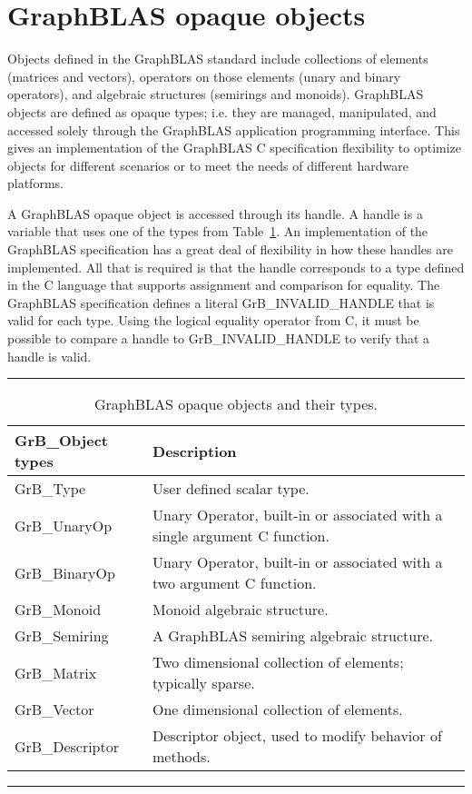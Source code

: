 \section{GraphBLAS opaque objects}

Objects defined in the GraphBLAS standard include collections of elements
(matrices and vectors), operators on those elements (unary and binary operators), and 
algebraic structures (semirings and monoids).   GraphBLAS objects are defined
as opaque types; i.e. they are managed, manipulated, and accessed solely through the
GraphBLAS application programming interface. This gives an implementation of the
GraphBLAS C specification flexibility to optimize objects for different scenarios or to meet
the needs of different hardware platforms.

A GraphBLAS opaque object is accessed through its handle.  A handle
is a variable that uses one of the types from Table~\ref{Tab:ObjTypes}.  An implementation 
of the GraphBLAS specification has a great deal of flexibility in how these
handles are implemented.  All that is required is that the handle corresponds to a type defined in the 
C language that supports assignment and comparison for equality.  The
GraphBLAS specification defines a 
literal {\sf GrB\_INVALID\_HANDLE} that is valid for each type.  Using the logical equality 
operator from C, it must be possible to compare a handle to {\sf GrB\_INVALID\_HANDLE}
to verify that a handle is valid.


\begin{table}
\hrule
\begin{center}
\caption{GraphBLAS opaque objects and their types.}
\label{Tab:ObjTypes}
\begin{tabular}{l|l}
{\sf GrB\_Object types} & Description \\
\hline
{\sf GrB\_Type}           & User defined scalar type.     \\
{\sf GrB\_UnaryOp}    & Unary Operator,  built-in or associated with a single argument C function.     \\
{\sf GrB\_BinaryOp}    & Unary Operator, built-in or associated with a two argument C function.     \\
{\sf GrB\_Monoid}       & Monoid algebraic structure.     \\
{\sf GrB\_Semiring}      & A GraphBLAS semiring algebraic structure.     \\
{\sf GrB\_Matrix}          & Two dimensional collection of elements; typically sparse.    \\
{\sf GrB\_Vector}         & One dimensional collection of elements.     \\
{\sf GrB\_Descriptor}    & Descriptor object, used to modify behavior of methods.     \\
\end{tabular}
\end{center}
\hrule
\end{table}

